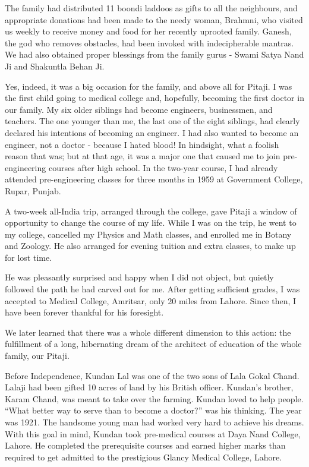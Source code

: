 The family had distributed 11 boondi laddoos as gifts to all the
neighbours, and appropriate donations had been made to the needy woman,
Brahmni, who visited us weekly to receive money and food for her recently
uprooted family. Ganesh, the god who removes obstacles, had been invoked
with indecipherable mantras. We had also obtained proper blessings from
the family gurus - Swami Satya Nand Ji and Shakuntla Behan Ji.

Yes, indeed, it was a big occasion for the family, and above all for
Pitaji. I was the first child going to medical college and, hopefully,
becoming the first doctor in our family. My six older siblings had become
engineers, businessmen, and teachers. The one younger than me, the last
one of the eight siblings, had clearly declared his intentions of becoming
an engineer. I had also wanted to become an engineer, not a doctor
- because I hated blood! In hindsight, what a foolish reason that was; but
at that age, it was a major one that caused me to join pre-engineering
courses after high school. In the two-year course, I had already attended
pre-engineering classes for three months in 1959 at Government College,
Rupar, Punjab.

A two-week all-India trip, arranged through the college, gave Pitaji
a window of opportunity to change the course of my life. While I was on
the trip, he went to my college, cancelled my Physics and Math classes,
and enrolled me in Botany and Zoology. He also arranged for evening
tuition and extra classes, to make up for lost time.

He was pleasantly surprised and happy when I did not object, but quietly
followed the path he had carved out for me. After getting sufficient
grades, I was accepted to Medical College, Amritsar, only 20 miles from
Lahore. Since then, I have been forever thankful for his foresight.

We later learned that there was a whole different dimension to this
action: the fulfillment of a long, hibernating dream of the architect of
education of the whole family, our Pitaji.

Before Independence, Kundan Lal was one of the two sons of Lala Gokal
Chand. Lalaji had been gifted 10 acres of land by his British officer.
Kundan's brother, Karam Chand, was meant to take over the farming. Kundan
loved to help people. “What better way to serve than to become a doctor?”
was his thinking. The year was 1921. The handsome young man had worked
very hard to achieve his dreams. With this goal in mind, Kundan took
pre-medical courses at Daya Nand College, Lahore. He completed the
prerequisite courses and earned higher marks than required to get admitted
to the prestigious Glancy Medical College, Lahore.

